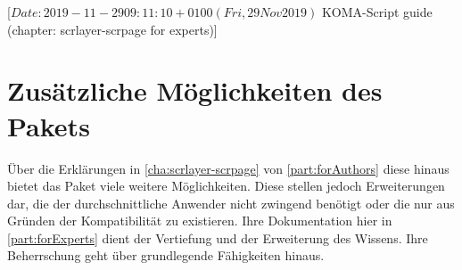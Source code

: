 %
%
%
%
%
%
%
%
% 
%
%
%
%

%
                 [$Date: 2019-11-29 09:11:10 +0100 (Fri, 29 Nov 2019) $
                  KOMA-Script guide (chapter: scrlayer-scrpage for experts)]

\chapter[{Zusätzliche Möglichkeiten von \Package{scrlayer-scrpage}}]
{Zusätzliche Möglichkeiten des
  Pakets
  }
%
\BeginIndexGroup
{}%
Über die Erklärungen in \autoref{cha:scrlayer-scrpage} von
\autoref{part:forAuthors} diese hinaus bietet
das Paket  viele weitere Möglichkeiten. Diese
stellen jedoch Erweiterungen dar, die der durchschnittliche Anwender
nicht zwingend benötigt oder die nur aus Gründen der Kompatibilität zu
 existieren. Ihre Dokumentation hier in
\autoref{part:forExperts} dient der Vertiefung und der Erweiterung des
Wissens. Ihre Beherrschung geht über grundlegende Fähigkeiten hinaus.

